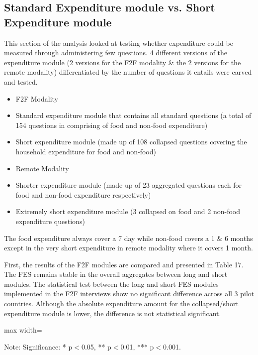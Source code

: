 \documentclass[11pt,harvard]{article}
\begin{document}
\subsection{Standard Expenditure module vs. Short Expenditure module}

This section of the analysis looked at testing whether expenditure could be measured through administering few questions. 4 different versions of the expenditure module (2 versions for the F2F modality \& the 2 versions for the remote modality) differentiated by the number of questions it entails were carved and tested.

\begin{itemize}[label=--, left=1.5em]
	\item F2F Modality
	\item[1] Standard expenditure module that contains all standard questions (a total of 154 questions in comprising of food and non-food expenditure)
	\item[2] Short expenditure module (made up of 108 collapsed questions covering the household expenditure for food and non-food)
	\item Remote Modality
	\item[1] Shorter expenditure module (made up of 23 aggregated questions each for food and non-food expenditure respectively)
	\item[2] Extremely short expenditure module (3 collapsed on food and 2 non-food expenditure questions)
\end{itemize}

The food expenditure always cover a 7 day while non-food covers a 1 \& 6 months except in the very short expenditure in remote modality where it covers 1 month.

First, the results of the F2F modules are compared and presented in Table 17. The FES remains stable in the overall aggregates between long and short modules. The statistical test between the long and short FES modules implemented in the F2F interviews show no significant difference across all 3 pilot countries. Although the absolute expenditure amount for the collapsed/short expenditure module is lower, the difference is not statistical significant. 

\begin{table}[htbp]
	\centering
	\begin{adjustbox}{max width=\textwidth}
		\begin{threeparttable}
			\caption{Impact of Module Length on Expenditure and FES in F2F Surveys}
			\scriptsize
			 
			\label{tab:FES_F2F_Form_Length_All_Country}
			\begin{tablenotes}
				\item Note: Significance: * p$<$0.05, ** p$<$0.01, *** p$<$0.001. 
			\end{tablenotes}
		\end{threeparttable}
	\end{adjustbox}
\end{table}
\end{document}
